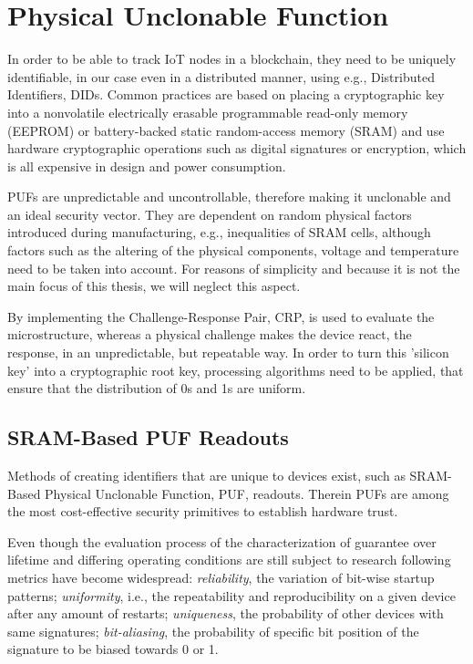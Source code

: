\section{Physical Unclonable Function} %
\label{sec:Physical Unclonable Function}


In order to be able to track IoT nodes in a blockchain, they need to be uniquely identifiable, in our case even in a
distributed manner, using e.g., Distributed Identifiers, DIDs.
Common practices are based on placing a cryptographic key into a nonvolatile electrically erasable programmable
read-only memory (EEPROM) or battery-backed static random-access memory (SRAM) and use hardware cryptographic operations
such as digital signatures or encryption, which is all expensive in design and power consumption. \cite{herder2014physical}

PUFs are unpredictable and uncontrollable, therefore making it unclonable and an ideal security vector. They are
dependent on random physical factors introduced during manufacturing, e.g., inequalities of SRAM cells, although factors
such as the altering of the physical components, voltage and temperature need to be taken into account. \cite{vinagrero2023sram}
For reasons of simplicity and because it is not the main focus of this thesis, we will neglect this aspect.

By implementing the Challenge-Response Pair, CRP, is used to evaluate the microstructure, whereas a physical challenge
makes the device react, the response, in an unpredictable, but repeatable way.
In order to turn this 'silicon key' into a cryptographic root key, processing algorithms need to be applied, that ensure
that the distribution of 0s and 1s are uniform. \cite{herder2014physical}

\subsection{SRAM-Based PUF Readouts} %
\label{sec:SRAM-Based PUF Readouts}

Methods of creating identifiers that are unique to devices exist, such as SRAM-Based Physical Unclonable Function, PUF,
readouts. Therein PUFs are among the most cost-effective security primitives to establish hardware trust.
\cite{holcomb2007initial}

Even though the evaluation process of the characterization of guarantee over lifetime and differing operating conditions
are still subject to research following metrics have become widespread: \textit{reliability}, the variation of bit-wise
startup patterns; \textit{uniformity}, i.e., the repeatability and reproducibility on a given device after any amount of
restarts; \textit{uniqueness}, the probability of other devices with same signatures; \textit{bit-aliasing}, the
probability of specific bit position of the signature to be biased towards 0 or 1. \cite{vinagrero2023sram}

